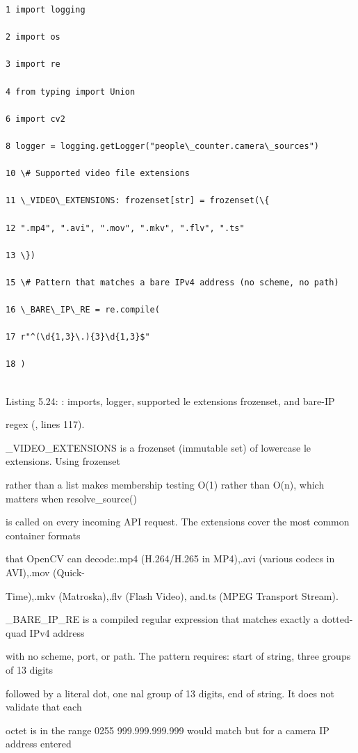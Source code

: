 \begin{listingbox}
	\begin{verbatim}
1 import logging

2 import os

3 import re

4 from typing import Union

6 import cv2

8 logger = logging.getLogger("people\_counter.camera\_sources")

10 \# Supported video file extensions

11 \_VIDEO\_EXTENSIONS: frozenset[str] = frozenset(\{

12 ".mp4", ".avi", ".mov", ".mkv", ".flv", ".ts"

13 \})

15 \# Pattern that matches a bare IPv4 address (no scheme, no path)

16 \_BARE\_IP\_RE = re.compile(

17 r"^(\d{1,3}\.){3}\d{1,3}$"

18 )


\end{verbatim}
\end{listingbox}
Listing 5.24: : imports, logger, supported le extensions frozenset, and bare-IP

regex (, lines 117).

\_VIDEO\_EXTENSIONS is a frozenset (immutable set) of lowercase le extensions. Using frozenset

rather than a list makes membership testing O(1) rather than O(n), which matters when resolve\_source()

is called on every incoming API request. The extensions cover the most common container formats

that OpenCV can decode:.mp4 (H.264/H.265 in MP4),.avi (various codecs in AVI),.mov (Quick-

Time),.mkv (Matroska),.flv (Flash Video), and.ts (MPEG Transport Stream).

\_BARE\_IP\_RE is a compiled regular expression that matches exactly a dotted-quad IPv4 address

with no scheme, port, or path. The pattern requires: start of string, three groups of 13 digits

followed by a literal dot, one nal group of 13 digits, end of string. It does not validate that each

octet is in the range 0255  999.999.999.999 would match  but for a camera IP address entered

